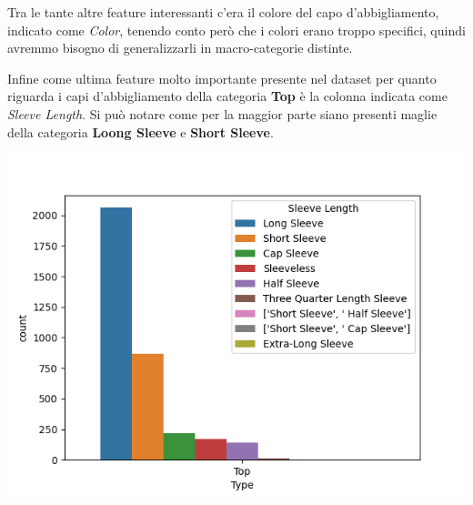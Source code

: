 \documentclass[a4paper, 11pt, oneside]{report}
\begin{document}
                \bigskip
                \par \noindent Tra le tante altre feature interessanti c'era il colore del capo d'abbigliamento, indicato
                come \textit{Color}, tenendo conto però che i colori erano troppo specifici, quindi avremmo bisogno di
                generalizzarli in macro-categorie distinte.
                \\
                \par \noindent Infine come ultima feature molto importante presente nel dataset per quanto riguarda i capi
                d'abbigliamento della categoria \textbf{Top} è la colonna indicata come \textit{Sleeve Length}. Si può
                notare come per la maggior parte siano presenti maglie della categoria \textbf{Loong Sleeve} e
                \textbf{Short Sleeve}.
                \begin{center}
                    \includegraphics[scale=0.4]{countLengthTop}
                \end{center}
                \newpage
\end{document}
